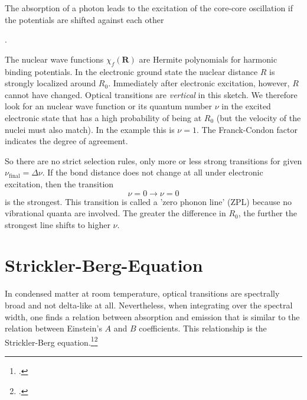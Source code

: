 \begin{marginfigure}
\caption{The absorption of a photon leads to the excitation of the core-core oscillation if the potentials are shifted against each other}.
\end{marginfigure}

The nuclear wave functions $\chi_f(\mathbf{R})$ are Hermite polynomials for harmonic binding potentials. In the electronic ground state the nuclear distance $R$ is strongly localized around $R_0$. Immediately after electronic excitation, however, $R$ cannot have changed. Optical transitions are \emph{vertical} in this sketch. We therefore look for an nuclear wave function or its quantum number $\nu$ in the excited electronic state that has a high probability of being at $R_0$ (but the velocity of the nuclei must also match). In the example this is $\nu = 1$. The Franck-Condon factor indicates the degree of agreement.

So there are no strict selection rules, only more or less strong transitions for given $\nu_\text{final} = \Delta \nu$. If the bond distance does not change at all under electronic excitation, then the transition
\begin{equation}
 \nu = 0 \rightarrow \nu = 0
\end{equation}
is the strongest. This transition is called a 'zero phonon line' (ZPL) because no vibrational quanta are involved. The greater the difference in $R_0$, the further the strongest line shifts to higher $\nu$. 




\section{Strickler-Berg-Equation} 


In condensed matter at room temperature, optical transitions are spectrally broad and not delta-like at all. Nevertheless, when integrating over the spectral width, one finds a relation between absorption and emission that is similar to the relation between Einstein's $A$ and $B$ coefficients. This relationship is the Strickler-Berg equation.\footcite[chapter 5.3][]{Strickler_Berg, Parson}\footcite[chapter 1.4.3.2]{KoehlerBaessler2015}


